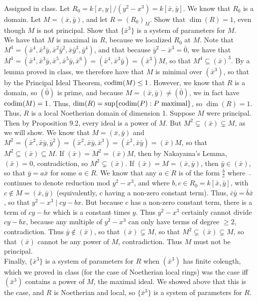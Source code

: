 \documentclass[11pt]{article}
\begin{document}
\num{Assigned in class.} Let $R_0=k[x,y]/(y^2-x^3)=k[\bar{x},\bar{y}]$. We know that $R_0$ is a domain. Let $M=(\bar{x},\bar{y})$, and let $R=(R_0)_M$. Show that $\dim(R)=1$, even though $M$ is not principal. Show that $\{\bar{x}^3\}$ is a system of parameters for $M$.\\

We have that $M$ is maximal in $R$, because we localized $R_0$ at $M$. Note that $M^4=(\bar{x}^4,\bar{x}^3\bar{y},\bar{x}^2\bar{y}^2,\bar{x}\bar{y}^3,\bar{y}^4)$, and that because $\bar{y}^2-\bar{x}^3=\bar{0}$, we have that $M^4=(\bar{x}^4,\bar{x}^3\bar{y},\bar{x}^5,\bar{x}^5\bar{y},\bar{x}^6)=(\bar{x}^4,\bar{x}^3\bar{y})=(\bar{x}^3)M$, so that $M^4\subseteq(\bar{x})^3$. By a lemma proved in class, we therefore have that $M$ is minimal over $(\bar{x}^3)$, so that by the Principal Ideal Theorem, $\operatorname{codim}(M)\leq 1$. However, we know that $R$ is a domain, so $(\bar{0})$ is prime, and because $M=(\bar{x},\bar{y})\neq(\bar{0})$, we in fact have $\operatorname{codim}(M)=1$. Thus, $\operatorname{dim}(R)=\sup\{\operatorname{codim}(P):P\text{ maximal}\}$, so $\dim(R)=1$. \\

Thus, $R$ is a local Noetherian domain of dimension 1. Suppose $M$ were principal. Then by Proposition 9.2, every ideal is a power of $M$. But $M^2\subsetneq(\bar{x})\subsetneq M$, as we will show. We know that $M=(\bar{x},\bar{y})$ and $M^2=(\bar{x}^2,\bar{x}\bar{y},\bar{y}^2)=(\bar{x}^2,\bar{x}\bar{y},\bar{x}^3)=(\bar{x}^2,\bar{x}\bar{y})=(\bar{x})M$, so that $M^2\subseteq(\bar{x})\subseteq M$. If $(\bar{x})=M^2=(\bar{x})M$, then by Nakayama's Lemma, $(\bar{x})=0$, contradiction, so $M^2\subsetneq(\bar{x})$. If $(\bar{x})=M=(\bar{x},\bar{y})$, then $\bar{y}\in(\bar{x})$, so that $\bar{y}=a\bar{x}$ for some $a\in R$. We know that any $a\in R$ is of the form $\frac{\bar{b}}{\bar{c}}$ where $\bar{\text{ }}$ continues to denote reduction mod $y^2-x^3$, and where $b,c\in R_0=k[\bar{x},\bar{y}]$, with $c\notin M=(\bar{x},\bar{y})$ (equivalently, $c$ having a non-zero constant term). Thus, $\bar{c}\bar{y}=\bar{b}\bar{x}$, so that $y^2-x^3\mid cy-bx$. But because $c$ has a non-zero constant term, there is a term of $cy-bx$ which is a constant times $y$. Thus $y^2-x^3$ certainly cannot divide $cy-bx$, because any multiple of $y^2-x^3$ can only have terms of degree $\geq 2$, contradiction. Thus $\bar{y}\notin(\bar{x})$, so that $(\bar{x})\subsetneq M$, so that $M^2\subsetneq(\bar{x})\subsetneq M$, so that $(\bar{x})$ cannot be any power of $M$, contradiction. Thus $M$ must not be principal.\\

Finally, $\{\bar{x}^3\}$ is a system of parameters for $R$ when $(\bar{x}^3)$ has finite colength, which we proved in class (for the case of Noetherian local rings) was the case iff $(\bar{x}^3)$ contains a power of $M$, the maximal ideal. We showed above that this is the case, and $R$ is Noetherian and local, so $\{\bar{x}^3\}$ is a system of parameters for $R$.
\end{document}
